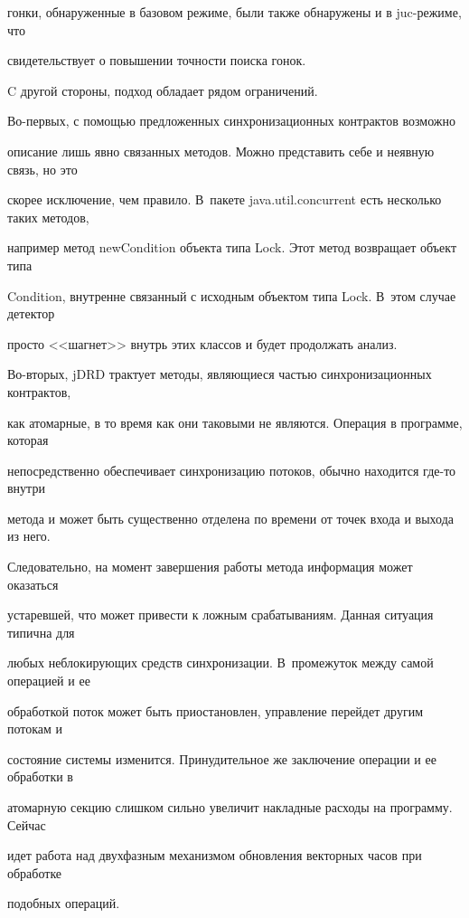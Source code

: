 гонки, обнаруженные в базовом режиме, были также обнаружены и в juc-режиме, что

свидетельствует о повышении точности поиска гонок.



  C другой стороны, подход обладает рядом ограничений.



  Во-пер\-вых, с помощью предложенных синхронизационных контрактов возможно

описание лишь явно связанных методов. Можно представить себе и неявную связь, но это

скорее исключение, чем правило. В~пакете {\sf java.util.concurrent} есть несколько таких методов,

например метод {\sf newCondition} объекта типа {\sf Lock}. Этот метод возвращает объект типа

Condition, внутренне связанный с исходным объектом типа {\sf Lock}. В~этом случае детектор

просто <<шагнет>> внутрь этих классов и будет продолжать анализ.



  Во-вторых, jDRD трактует методы, являющиеся частью синхронизационных контрактов,

как атомарные, в то время как они таковыми не являются. Операция в программе, которая

непосредственно обеспечивает синхронизацию потоков, обычно находится где-то внутри

метода и может быть существенно отделена по времени от точек входа и выхода из него.

Следовательно, на момент завершения работы метода информация может оказаться

устаревшей, что может привести к ложным срабатываниям. Данная ситуация типична для

любых неблокирующих средств синхронизации. В~промежуток между самой операцией и ее

обработкой поток может быть приостановлен, управление перейдет другим потокам и

состояние системы изменится. Принудительное же заключение операции и ее обработки в

атомарную секцию слишком сильно увеличит накладные расходы на программу. Сейчас

идет работа над двухфазным механизмом обновления векторных часов при обработке

подобных операций.



